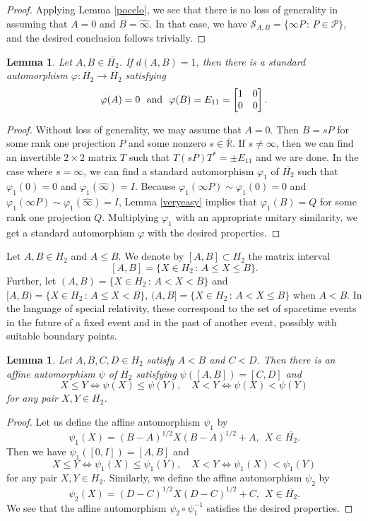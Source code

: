 \documentclass[10pt,a4paper]{amsart}
\providecommand{\index}[1]{}
\newcommand\cP{{\mathcal{P}}}
\newcommand\oH{{\overline{H_2}}}
\newcommand\oi{{\widehat{\infty}}}
\newcommand\oR{{\overline{\mathbb{R}}}}
\newtheorem{lemma}[theorem]{Lemma}
\theoremstyle{definition}
\theoremstyle{remark}
\numberwithin{subsection}{section}
\numberwithin{equation}{section}
\begin{document}
\begin{proof}
Applying Lemma \ref{pocelo}, we see that there is no loss of generality in assuming that $A=0$ and $B=\oi$. In that case, we have ${\mathcal{S}}_{A,B}=\{\infty P\,:\, P\in \cP\}$, and the desired conclusion follows trivially.
\end{proof}


\begin{lemma}\label{pocelo1}
Let $A,B \in \oH$. If $d(A,B) = 1$, then there is a standard automorphism $\varphi \colon \oH \to \oH$ satisfying
\[
\varphi (A) = 0\ \  \text{and}\ \ \varphi (B) = E_{11}=\left[ \begin{matrix} 1 &0 \cr 0 & 0\cr \end{matrix} \right].
\]
\end{lemma}

\begin{proof}
Without loss of generality, we may assume that $A=0$. Then $B= sP$ for some rank one projection $P$ and some nonzero $s \in {\oR}$. If $s\not=\infty$, then we can find an invertible $2 \times 2$ matrix $T$ such that $T(sP)T^\ast = \pm E_{11}$ and we are done. In the case where $s= \infty$, we can find a standard automorphism $\varphi_1$ of $\oH$ such that $\varphi_1 (0) = 0$ and $\varphi_1 ({\oi}) = I$. Because $\varphi_1 (\infty P) \sim \varphi_1 (0)=0$ and  $\varphi_1 (\infty P) \sim \varphi_1  ({\oi}) = I$, Lemma \ref{veryeasy} implies that $\varphi_1 (B) = Q$ for some rank one projection $Q$. Multiplying $\varphi_1$ with an appropriate unitary similarity, we get a standard automorphism $\varphi$ with the desired properties.
\end{proof}


Let $A,B \in H_2$ and $A \leq B$. We denote by $[A,B] \subset H_2$ \index{$AB$1@$[A,B]$} the matrix interval \index{matrix interval}
\[
[A,B] = \{ X \in H_2 \, : \, A \le X \le B \}.
\]
Further, let $(A,B) = \{ X \in H_2 \, : \, A < X < B \}$ \index{$AB$2@$(A,B)$} and $[A,B) = \{ X \in H_2 \, : \, A \le  X < B \}$\index{$AB$3@$[A,B)$}, $(A,B] = \{ X \in H_2 \, : \, A <  X \leq B \}$ \index{$AB$4@$(A,B]$} when $A<B$. 
In the language of special relativity, these correspond to the set of spacetime events in the future of a fixed event and in the past of another event, possibly with suitable boundary points.


\begin{lemma}\label{Porder}
Let $A, B, C, D\in H_2$ satisfy $A<B$ and $C<D$.
Then there is an affine automorphism $\psi$ of $\oH$ satisfying $\psi([A, B])=[C, D]$ and 
\[
X\leq Y\iff \psi(X)\leq \psi(Y),\quad X< Y\iff \psi(X)< \psi(Y)
\]
for any pair $X, Y\in H_2$.
\end{lemma}
\begin{proof}
Let us define the affine automorphism $\psi_1$ by 
\[
\psi_1(X)=(B-A)^{1/2}X(B-A)^{1/2} + A,\ \ X\in \oH.
\]
Then we have 
$\psi_1([0, I])=[A, B]$ and 
\[
X\leq Y\iff \psi_1(X)\leq \psi_1(Y),\quad X< Y\iff \psi_1(X)< \psi_1(Y)
\]
for any pair $X, Y\in H_2$.
Similarly, we define the affine automorphism $\psi_2$ by 
\[
\psi_2(X)=(D-C)^{1/2}X(D-C)^{1/2} + C,\ \ X\in \oH. 
\]
We see that the affine automorphism $\psi_2\circ\psi_1^{-1}$ satisfies the desired properties.
\end{proof}
\end{document}
